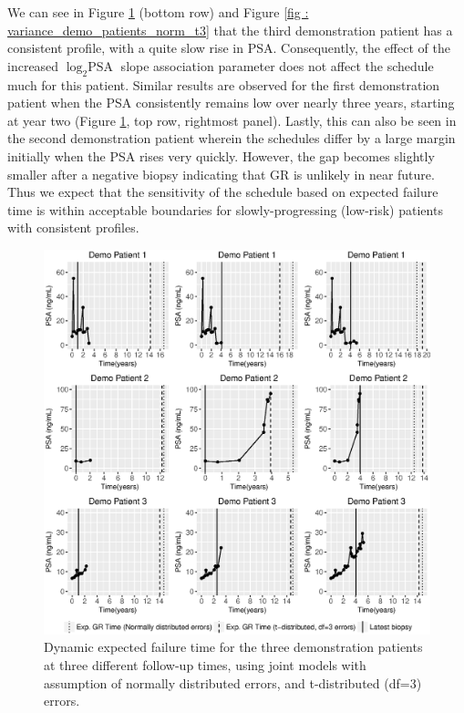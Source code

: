 \begin{enumerate}
    We can see in Figure \ref{fig : demo_expfail_norm_t3} (bottom row) and Figure \ref{fig : variance_demo_patients_norm_t3} that the third demonstration patient has a consistent profile, with a quite slow rise in PSA. Consequently, the effect of the increased $\log_2 \mbox{PSA}$ slope association parameter does not affect the schedule much for this patient. Similar results are observed for the first demonstration patient when the PSA consistently remains low over nearly three years, starting at year two (Figure \ref{fig : demo_expfail_norm_t3}, top row, rightmost panel). Lastly, this can also be seen in the second demonstration patient wherein the schedules differ by a large margin initially when the PSA rises very quickly. However, the gap becomes slightly smaller after a negative biopsy indicating that GR is unlikely in near future. Thus we expect that the sensitivity of the schedule based on expected failure time is within acceptable boundaries for slowly-progressing (low-risk) patients with consistent profiles.

    \begin{figure}[!htb]
    \centerline{\includegraphics[width=\columnwidth]{../images/model_fit/demo_expfail_norm_t3.eps}}
    \caption{Dynamic expected failure time for the three demonstration patients at three different follow-up times, using joint models with assumption of normally distributed errors, and t-distributed (df=3) errors.}
    \label{fig : demo_expfail_norm_t3}
    \end{figure}


\end{enumerate}
